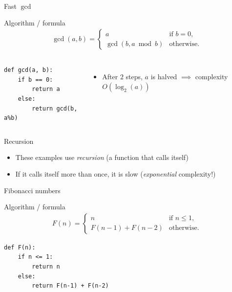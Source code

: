 \documentclass[11pt]{beamer}
\begin{document}
\begin{frame}[fragile]{Fast $\gcd$}
	\begin{block}{Algorithm / formula}
		\begin{align*}
			\gcd(a,b) =
			\begin{cases}
				a                     & \text{if }b=0,\\
				\gcd(b,a\bmod b)      & \text{otherwise.}
			\end{cases}
		\end{align*}
	\end{block}

\begin{columns}
\begin{lstlisting}
def gcd(a, b):
	if b == 0:
		return a
	else:
		return gcd(b, a%b)
\end{lstlisting}

\begin{itemize}
	\item After $2$ steps, $a$ is halved $\implies$ complexity $O(\log_2(a))$
\end{itemize}
\end{columns}
\end{frame}

\begin{frame}{Recursion}
	\begin{itemize}
		\item These examples use \emph{recursion}
		      (a function that calls itself)
		\item If it calls itself more than once, it is slow
		      (\emph{exponential} complexity!)
	\end{itemize}
\end{frame}

\begin{frame}[fragile]{Fibonacci numbers}

	\begin{block}{Algorithm / formula}
		\begin{align*}
			F(n) =
			\begin{cases}
				n                     & \text{if }n\leq1,\\
				F(n-1)+F(n-2)         & \text{otherwise.}
			\end{cases}
		\end{align*}
	\end{block}

\vspace{0.5cm}
\begin{lstlisting}
def F(n):
	if n <= 1:
		return n
	else:
		return F(n-1) + F(n-2)
\end{lstlisting}
\end{frame}
\end{document}
